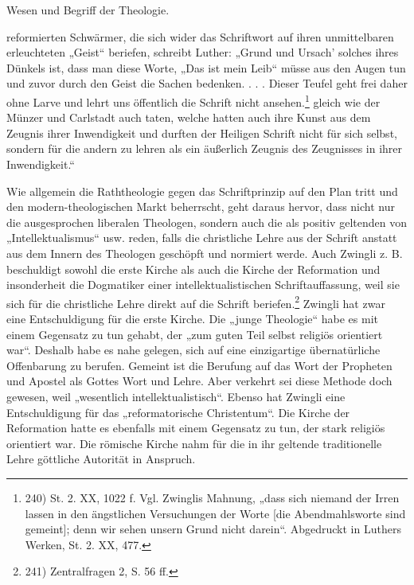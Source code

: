 \hfill Wesen und Begriff der Theologie.\par\noindent reformierten Schwärmer, die sich wider das Schriftwort auf ihren unmittelbaren erleuchteten „Geist“ beriefen, schreibt Luther: „Grund und Ursach’ solches ihres Dünkels ist, dass man diese Worte, „Das ist mein Leib“ müsse aus den Augen tun und zuvor durch den Geist die Sachen bedenken. . . . Dieser Teufel geht frei daher ohne Larve und lehrt uns öffentlich die Schrift nicht ansehen.\footnote{240) St. 2. XX, 1022 f. Vgl. Zwinglis Mahnung, „dass sich niemand der Irren lassen in den ängstlichen Versuchungen der Worte [die Abendmahlsworte sind gemeint]; denn wir sehen unsern Grund nicht darein“. Abgedruckt in Luthers Werken, St. 2. XX, 477.} gleich wie der Münzer und Carlstadt auch taten, welche hatten auch ihre Kunst aus dem Zeugnis ihrer Inwendigkeit und durften der Heiligen Schrift nicht für sich selbst, sondern für die andern zu lehren als ein äußerlich Zeugnis des Zeugnisses in ihrer Inwendigkeit.“\par\noindent Wie allgemein die Raththeologie gegen das Schriftprinzip auf den Plan tritt und den modern-theologischen Markt beherrscht, geht daraus hervor, dass nicht nur die ausgesprochen liberalen Theologen, sondern auch die als positiv geltenden von „Intellektualismus“ usw. reden, falls die christliche Lehre aus der Schrift anstatt aus dem Innern des Theologen geschöpft und normiert werde. Auch Zwingli z. B. beschuldigt sowohl die erste Kirche als auch die Kirche der Reformation und insonderheit die Dogmatiker einer intellektualistischen Schriftauffassung, weil sie sich für die christliche Lehre direkt auf die Schrift beriefen.\footnote{241) Zentralfragen 2, S. 56 ff.} Zwingli hat zwar eine Entschuldigung für die erste Kirche. Die „junge Theologie“ habe es mit einem Gegensatz zu tun gehabt, der „zum guten Teil selbst religiös orientiert war“. Deshalb habe es nahe gelegen, sich auf eine einzigartige übernatürliche Offenbarung zu berufen. Gemeint ist die Berufung auf das Wort der Propheten und Apostel als Gottes Wort und Lehre. Aber verkehrt sei diese Methode doch gewesen, weil „wesentlich intellektualistisch“. Ebenso hat Zwingli eine Entschuldigung für das „reformatorische Christentum“. Die Kirche der Reformation hatte es ebenfalls mit einem Gegensatz zu tun, der stark religiös orientiert war. Die römische Kirche nahm für die in ihr geltende traditionelle Lehre göttliche Autorität in Anspruch.